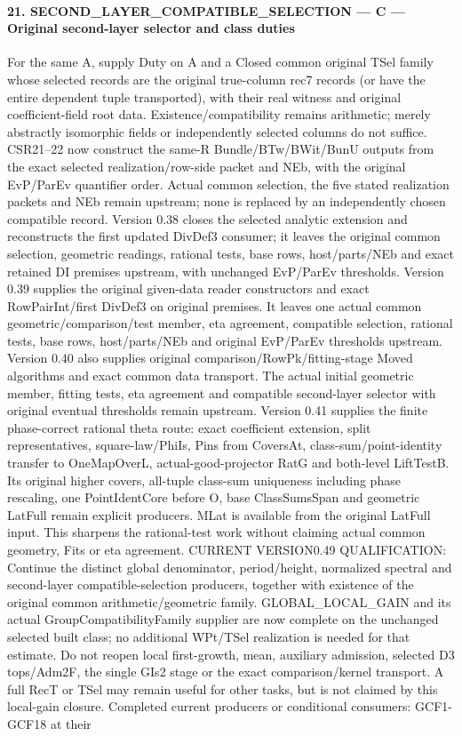 \paragraph{21. SECOND\_\allowbreak LAYER\_\allowbreak COMPATIBLE\_\allowbreak SELECTION — C — Original second-layer selector and class duties}

For the same A, supply Duty on A and a Closed common original TSel family whose selected records are the original true-column rec7 records (or have the entire dependent tuple transported), with their real witness and original coefficient-field root data. Existence/compatibility remains arithmetic; merely abstractly isomorphic fields or independently selected columns do not suffice. CSR21–22 now construct the same-R Bundle/BTw/BWit/BunU outputs from the exact selected realization/row-side packet and NEb, with the original EvP/ParEv quantifier order. Actual common selection, the five stated realization packets and NEb remain upstream; none is replaced by an independently chosen compatible record. Version 0.38 closes the selected analytic extension and reconstructs the first updated DivDef3 consumer; it leaves the original common selection, geometric readings, rational tests, base rows, host/parts/NEb and exact retained DI premises upstream, with unchanged EvP/ParEv thresholds. Version 0.39 supplies the original given-data reader constructors and exact RowPairInt/first DivDef3 on original premises. It leaves one actual common geometric/comparison/test member, eta agreement, compatible selection, rational tests, base rows, host/parts/NEb and original EvP/ParEv thresholds upstream. Version 0.40 also supplies original comparison/RowPk/fitting-stage Moved algorithms and exact common data transport. The actual initial geometric member, fitting tests, eta agreement and compatible second-layer selector with original eventual thresholds remain upstream. Version 0.41 supplies the finite phase-correct rational theta route: exact coefficient extension, split representatives, square-law/PhiIs, Pins from CoversAt, class-sum/point-identity transfer to OneMapOverL, actual-good-projector RatG and both-level LiftTestB. Its original higher covers, all-tuple class-sum uniqueness including phase rescaling, one PointIdentCore before O, base ClassSumsSpan and geometric LatFull remain explicit producers. MLat is available from the original LatFull input. This sharpens the rational-test work without claiming actual common geometry, Fits or eta agreement. CURRENT VERSION0.49 QUALIFICATION: Continue the distinct global denominator, period/height, normalized spectral and second-layer compatible-selection producers, together with existence of the original common arithmetic/geometric family. GLOBAL\_\allowbreak LOCAL\_\allowbreak GAIN and its actual GroupCompatibilityFamily supplier are now complete on the unchanged selected built class; no additional WPt/TSel realization is needed for that estimate. Do not reopen local first-growth, mean, auxiliary admission, selected D3 tops/Adm2F, the single GIs2 stage or the exact comparison/kernel transport. A full RecT or TSel may remain useful for other tasks, but is not claimed by this local-gain closure. Completed current producers or conditional consumers: GCF1-GCF18 at their 